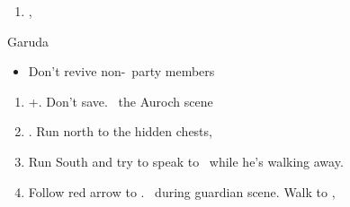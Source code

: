 \begin{enumerate}[resume]
  \item \sd, \skippablefmv
\end{enumerate}
\begin{battle}[1800]{Garuda}
  \begin{itemize}
    \tidusf Haste \auron
    \auronf Attack x3
    \wakkaf Defend
    \tidusf Defend until \auron\ finishes his string, then Attack
    \auronf Attack x3
    \item Don't revive non-\auron\ party members
  \end{itemize}
\end{battle}
\begin{enumerate}[resume]
  \item \cs+\skippablefmv[1:30]. Don't save. \sd\ the Auroch scene
  \item \cs[4:50]. Run north to the hidden chests, 
  \item Run South and try to speak to \auron\ while he's walking away.
  \item Follow red arrow to \yuna. \sd\ during guardian scene. Walk to \yuna, \cs[4:20]
\end{enumerate}